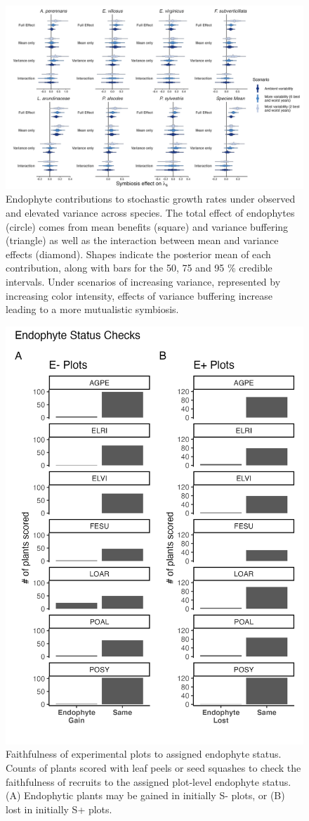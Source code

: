 \documentclass[9pt,twoside,lineno]{pnas-new}
\begin{document}
\begin{figure}
	\centering
	\includegraphics[width=\linewidth]{contributions_obs_plot.png}
	\caption{Endophyte contributions to stochastic growth rates under observed and elevated variance across species. The total effect of endophytes (circle) comes from mean benefits (square) and variance buffering (triangle) as well as the interaction between mean and variance effects (diamond). Shapes indicate the posterior mean of each contribution, along with bars for the 50, 75 and 95 \% credible intervals.  Under scenarios of increasing variance, represented by increasing color intensity, effects of variance buffering increase leading to a more mutualistic symbiosis.}
\end{figure}


\begin{figure}
	\centering
	\includegraphics[width=.6\linewidth]{endo_check_plot.png}
	\caption{Faithfulness of experimental plots to assigned endophyte status. Counts of plants scored with leaf peels or seed squashes to check the faithfulness of recruits to the assigned plot-level endophyte status. (A) Endophytic plants may be gained in initially S- plots, or (B) lost in initially S+ plots.}
\end{figure}
\end{document}
